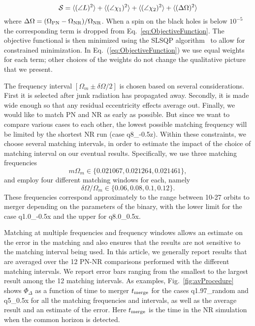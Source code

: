 \documentclass[aps,prd,amsmath,floatfix,twocolumn,superscriptaddress,nofootinbib,showpacs]{revtex4-1}
\begin{document}
\begin{equation}
\label{eq:ObjectiveFunction}
{\cal S}=\langle(\angle L)^{2}\rangle+\langle(\angle
\chi_{1})^{2}\rangle+\langle(\angle \chi_{2})^{2}\rangle + \langle(\Delta\Omega)^{2}\rangle
\end{equation}
where $\Delta\Omega = (\Omega_{\rm PN}-\Omega_{\rm NR})/\Omega_{\rm
  NR}$.  When a spin on the black holes is below $10^{-5}$ the
corresponding term is dropped from
Eq.~\eqref{eq:ObjectiveFunction}. The objective functional is then
minimized using the SLSQP algorithm~\cite{Kraft:1988, pyopt-paper} to
allow for constrained minimization.  In
Eq.~(\ref{eq:ObjectiveFunction}) we use equal weights for each term;
other choices of the weights do not change the qualitative picture
that we present.

The frequency interval $[\Omega_m\pm \delta\Omega/2]$ is chosen based
on several considerations. First it is selected after junk radiation
has propagated away. Secondly, it is made wide enough so that any
residual eccentricity effects average out.  Finally, we would like to
match PN and NR as early as possible.  But since we want to compare
various cases to each other, the lowest possible matching frequency
will be limited by the shortest NR run (case q8\_-0.5z).  Within these
constraints, we choose several matching intervals, in order to
estimate the impact of the choice of matching interval on our eventual
results.  Specifically, we use three matching frequencies
\begin{equation}
\label{eq:Omega_m}
m\Omega_m\in \{ 0.021067,0.021264,0.021461 \},
\end{equation}
and employ four different matching windows for each, namely
\begin{equation}
\label{eq:deltaOmega}
\delta\Omega/\Omega_m\in \{0.06,0.08,0.1,0.12\}.
\end{equation}
These frequencies correspond approximately to the range between 10-27
orbits to merger depending on the parameters of the binary, with the
lower limit for the case q1.0\_-0.5x and the upper for q8.0\_0.5x.

Matching at multiple frequencies and frequency windows allows an
estimate on the error in the matching and also ensures that the
results are not sensitive to the matching interval being used.  In
this article, we generally report results that are averaged over the
12 PN-NR comparisons performed with the different matching intervals.
We report error bars ranging from the smallest to the largest result
among the 12 matching intervals.  As examples,
Fig.~\ref{fig:avProcedure} shows $\Phi_{\Delta}$ as a function of time
to merger $t_{\rm merge}$ for the cases q1.97\_random and q5\_0.5x for
all the matching frequencies and intervals, as well as the average
result and an estimate of the error. Here $t_{\rm merge}$ is the time
in the NR simulation when the common horizon is detected.
\end{document}
